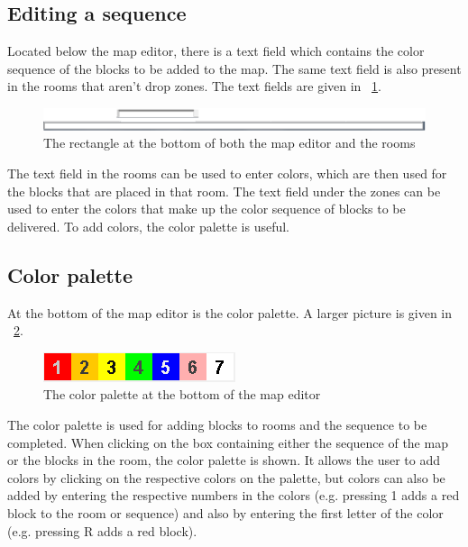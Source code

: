 \subsection{Editing a sequence}
Located below the map editor, there is a text field which contains the color sequence of the blocks to be added to the map. The same text field is also present in the rooms that aren't drop zones. The text fields are given in ~\ref{fig:seqEditor}.
\begin{figure}[h]
	\includegraphics[scale=0.5]{NewFeatures/SequenceEditor.png}
\caption{The rectangle at the bottom of both the map editor and the rooms}
\label{fig:seqEditor}
\end{figure}
The text field in the rooms can be used to enter colors, which are then used for the blocks that are placed in that room. The text field under the zones can be used to enter the colors that make up the color sequence of blocks to be delivered. To add colors, the color palette is useful.
\subsection{Color palette}
At the bottom of the map editor is the color palette. A larger picture is given in ~\ref{fig:colors}.
\begin{figure}[h]
	\includegraphics{NewFeatures/ColorPalette.png}
\caption{The color palette at the bottom of the map editor}
\label{fig:colors}
\end{figure}
The color palette is used for adding blocks to rooms and the sequence to be completed. When clicking on the box containing either the sequence of the map or the blocks in the room, the color palette is shown. It allows the user to add colors by clicking on the respective colors on the palette, but colors can also be added by entering the respective numbers in the colors (e.g. pressing 1 adds a red block to the room or sequence) and also by entering the first letter of the color (e.g. pressing R adds a red block).
